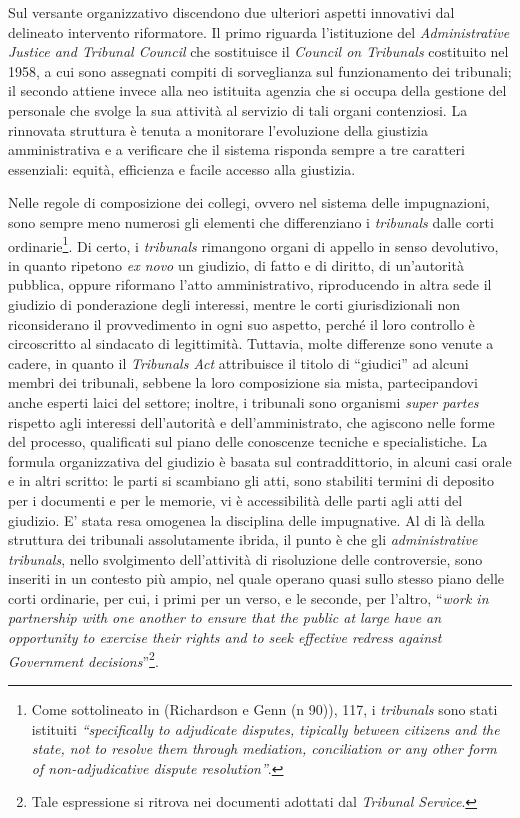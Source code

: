 \documentclass[12pt,it,a4paper,]{report}
\begin{document}
Sul versante organizzativo discendono due ulteriori aspetti innovativi
dal delineato intervento riformatore. Il primo riguarda l'istituzione
del \emph{Administrative Justice and Tribunal Council} che sostituisce
il \emph{Council on Tribunals} costituito nel 1958, a cui sono assegnati
compiti di sorveglianza sul funzionamento dei tribunali; il secondo
attiene invece alla neo istituita agenzia che si occupa della gestione
del personale che svolge la sua attività al servizio di tali organi
contenziosi. La rinnovata struttura è tenuta a monitorare l'evoluzione
della giustizia amministrativa e a verificare che il sistema risponda
sempre a tre caratteri essenziali: equità, efficienza e facile accesso
alla giustizia.

Nelle regole di composizione dei collegi, ovvero nel sistema delle
impugnazioni, sono sempre meno numerosi gli elementi che differenziano i
\emph{tribunals} dalle corti ordinarie\footnote{Come sottolineato in
  (Richardson e Genn (n 90)), 117, i \emph{tribunals} sono stati
  istituiti \emph{``specifically to adjudicate disputes, tipically
  between citizens and the state, not to resolve them through mediation,
  conciliation or any other form of non-adjudicative dispute
  resolution''}.}. Di certo, i \emph{tribunals} rimangono organi di
appello in senso devolutivo, in quanto ripetono \emph{ex novo} un
giudizio, di fatto e di diritto, di un'autorità pubblica, oppure
riformano l'atto amministrativo, riproducendo in altra sede il giudizio
di ponderazione degli interessi, mentre le corti giurisdizionali non
riconsiderano il provvedimento in ogni suo aspetto, perché il loro
controllo è circoscritto al sindacato di legittimità. Tuttavia, molte
differenze sono venute a cadere, in quanto il \emph{Tribunals Act}
attribuisce il titolo di ``giudici'' ad alcuni membri dei tribunali,
sebbene la loro composizione sia mista, partecipandovi anche esperti
laici del settore; inoltre, i tribunali sono organismi \emph{super
partes} rispetto agli interessi dell'autorità e dell'amministrato, che
agiscono nelle forme del processo, qualificati sul piano delle
conoscenze tecniche e specialistiche. La formula organizzativa del
giudizio è basata sul contraddittorio, in alcuni casi orale e in altri
scritto: le parti si scambiano gli atti, sono stabiliti termini di
deposito per i documenti e per le memorie, vi è accessibilità delle
parti agli atti del giudizio. E' stata resa omogenea la disciplina delle
impugnative. Al di là della struttura dei tribunali assolutamente
ibrida, il punto è che gli \emph{administrative tribunals}, nello
svolgimento dell'attività di risoluzione delle controversie, sono
inseriti in un contesto più ampio, nel quale operano quasi sullo stesso
piano delle corti ordinarie, per cui, i primi per un verso, e le
seconde, per l'altro, ``\emph{work in partnership with one another to
ensure that the public at large have an opportunity to exercise their
rights and to seek effective redress against Government
decisions}''\footnote{Tale espressione si ritrova nei documenti adottati
  dal \emph{Tribunal Service}.}.
\end{document}
